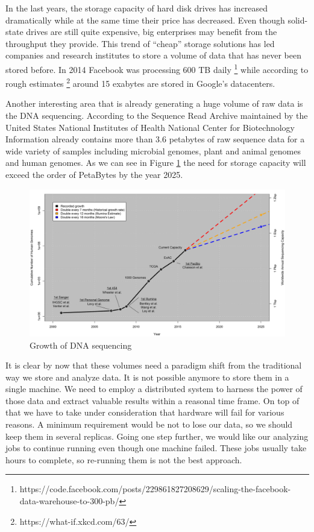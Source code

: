 In the last years, the storage capacity of hard disk drives has
increased dramatically while at the same time their price has
decreased. Even though solid-state drives are still quite expensive,
big enterprises may benefit from the throughput they provide. This
trend of ``cheap'' storage solutions has led companies and research
institutes to store a volume of data that has never been stored
before. In 2014 Facebook was processing 600 TB daily
\footnote{https://code.facebook.com/posts/229861827208629/scaling-the-facebook-data-warehouse-to-300-pb/}
while according to rough estimates
\footnote{https://what-if.xkcd.com/63/} around 15 exabytes are stored
in Google's datacenters.

Another interesting area that is already generating a huge volume of
raw data is the DNA sequencing. According to \cite{10.1371/journal.pbio.1002195} the Sequence
Read Archive maintained by the United States National Institutes of Health
National Center for Biotechnology Information already contains more
than 3.6 petabytes of raw sequence data for a wide variety of samples
including microbial genomes, plant and animal genomes and human
genomes. As we can see in Figure \ref{fig:intro_genomics_growth} the
need for storage capacity will exceed the order of PetaBytes by the
year 2025.

\begin{figure}
\centering
\includegraphics[scale=0.5]{resources/images/Introduction/genomics_growth.png}
\caption{Growth of DNA sequencing \cite{10.1371/journal.pbio.1002195}}
\label{fig:intro_genomics_growth}
\end{figure}

It is clear by now that these volumes need a paradigm shift
from the traditional way we store and analyze data. It is not possible
anymore to store them in a single machine. We need to employ a
distributed system to harness the power of those data and extract
valuable results within a reasonal time frame. On top of that we have
to take under consideration that hardware will fail for various
reasons. A minimum requirement would be not to lose our data, so we
should keep them in several replicas. Going one step further, we would
like our analyzing jobs to continue running even though one machine failed. These
jobs usually take hours to complete, so re-running them is not the
best approach.
